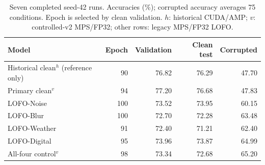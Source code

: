 \begin{table}[!htbp]
\caption{Seven completed seed-42 runs. Accuracies (\%); corrupted accuracy averages 75 conditions. Epoch is selected by clean validation. $h$: historical CUDA/AMP; $v$: controlled-v2 MPS/FP32; other rows: legacy MPS/FP32 LOFO.}
\label{tab:overall}
\centering
\setlength{\tabcolsep}{8pt}
\begin{tabular}{lrrrr}
\toprule
Model & Epoch & Validation & Clean test & Corrupted \\
\midrule
Historical clean$^{h}$ (reference only) & 90 & 76.82 & 76.29 & 47.70 \\
Primary clean$^{v}$ & 94 & 77.20 & 76.68 & 47.83 \\
LOFO-Noise & 100 & 73.52 & 73.95 & 60.15 \\
LOFO-Blur & 100 & 72.70 & 72.28 & 63.48 \\
LOFO-Weather & 91 & 72.40 & 71.21 & 62.40 \\
LOFO-Digital & 95 & 73.96 & 73.87 & 64.99 \\
All-four control$^{v}$ & 98 & 73.34 & 72.68 & 65.20 \\
\bottomrule
\end{tabular}
\end{table}
